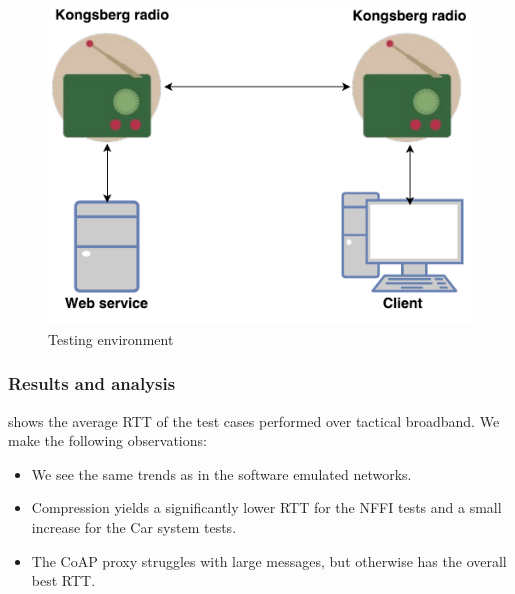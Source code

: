 \begin{figure}[h]
\centering
\includegraphics[scale=0.6]{images/radio_testing_environment.pdf}
\caption{Testing environment}
\label{figure-radio-testing-environment}
\end{figure}

\subsubsection{Results and analysis}

 shows the average RTT of the test cases
performed over tactical broadband. We make the following observations:

\begin{itemize}

    \item We see the same trends as in the software emulated networks.

    \item Compression yields a significantly lower RTT for the NFFI tests and a
    small increase for the Car system tests.

    \item The CoAP proxy struggles with large messages, but otherwise has the
    overall best RTT.

\end{itemize}

